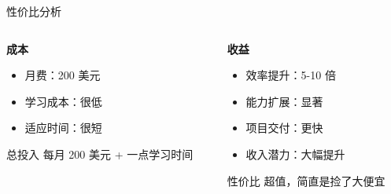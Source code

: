 \documentclass[aspectratio=169,xcolor=dvipsnames]{beamer}
\begin{document}
\begin{frame}{性价比分析}
  \begin{columns}
    \begin{column}{0.48\textwidth}
      \textbf{成本}
      \begin{itemize}
        \item 月费：200 美元
        \item 学习成本：很低
        \item 适应时间：很短
      \end{itemize}

      \vspace{0.5cm}

      \begin{block}{总投入}
        每月 200 美元 + 一点学习时间
      \end{block}
    \end{column}
    \begin{column}{0.48\textwidth}
      \textbf{收益}
      \begin{itemize}
        \item 效率提升：5-10 倍
        \item 能力扩展：显著
        \item 项目交付：更快
        \item 收入潜力：大幅提升
      \end{itemize}

      \vspace{0.5cm}

      \begin{alertblock}{性价比}
        超值，简直是捡了大便宜
      \end{alertblock}
    \end{column}
  \end{columns}
\end{frame}
\end{document}
